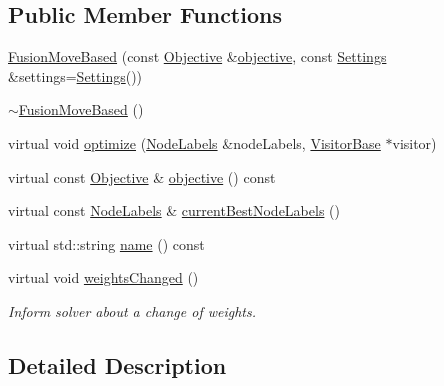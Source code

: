 \subsection*{Public Member Functions}
\begin{DoxyCompactItemize}
\item 
\hyperlink{classnifty_1_1graph_1_1FusionMoveBased_a5c0a9730928bb116ff58d68b2fa21b57}{Fusion\+Move\+Based} (const \hyperlink{classnifty_1_1graph_1_1FusionMoveBased_afe9396032c919255647c24b46a54bee4}{Objective} \&\hyperlink{classnifty_1_1graph_1_1FusionMoveBased_aa1ad80344d5d4efe39baefa74fe644bd}{objective}, const \hyperlink{structnifty_1_1graph_1_1FusionMoveBased_1_1Settings}{Settings} \&settings=\hyperlink{structnifty_1_1graph_1_1FusionMoveBased_1_1Settings}{Settings}())
\item 
\hyperlink{classnifty_1_1graph_1_1FusionMoveBased_ad4e8cb44892a80e570c0740445d9ebca}{$\sim$\+Fusion\+Move\+Based} ()
\item 
virtual void \hyperlink{classnifty_1_1graph_1_1FusionMoveBased_a499fae7e131cc00108fd24372f2784b3}{optimize} (\hyperlink{classnifty_1_1graph_1_1FusionMoveBased_a48c9960174a5a3e9c3bbe9756c7b4c22}{Node\+Labels} \&node\+Labels, \hyperlink{classnifty_1_1graph_1_1FusionMoveBased_a920e1485e8ab123a4e0ae0773870f4d9}{Visitor\+Base} $\ast$visitor)
\item 
virtual const \hyperlink{classnifty_1_1graph_1_1FusionMoveBased_afe9396032c919255647c24b46a54bee4}{Objective} \& \hyperlink{classnifty_1_1graph_1_1FusionMoveBased_aa1ad80344d5d4efe39baefa74fe644bd}{objective} () const 
\item 
virtual const \hyperlink{classnifty_1_1graph_1_1FusionMoveBased_a48c9960174a5a3e9c3bbe9756c7b4c22}{Node\+Labels} \& \hyperlink{classnifty_1_1graph_1_1FusionMoveBased_adba12c69e0ab0f9a669736c03fe1b3d3}{current\+Best\+Node\+Labels} ()
\item 
virtual std\+::string \hyperlink{classnifty_1_1graph_1_1FusionMoveBased_a2235fea9a823c32c1b3ab1fe8f253978}{name} () const 
\item 
virtual void \hyperlink{classnifty_1_1graph_1_1FusionMoveBased_ac537bd46f1a797859393aef142b1bfd5}{weights\+Changed} ()
\begin{DoxyCompactList}\small\item\em Inform solver about a change of weights. \end{DoxyCompactList}\end{DoxyCompactItemize}


\subsection{Detailed Description}

